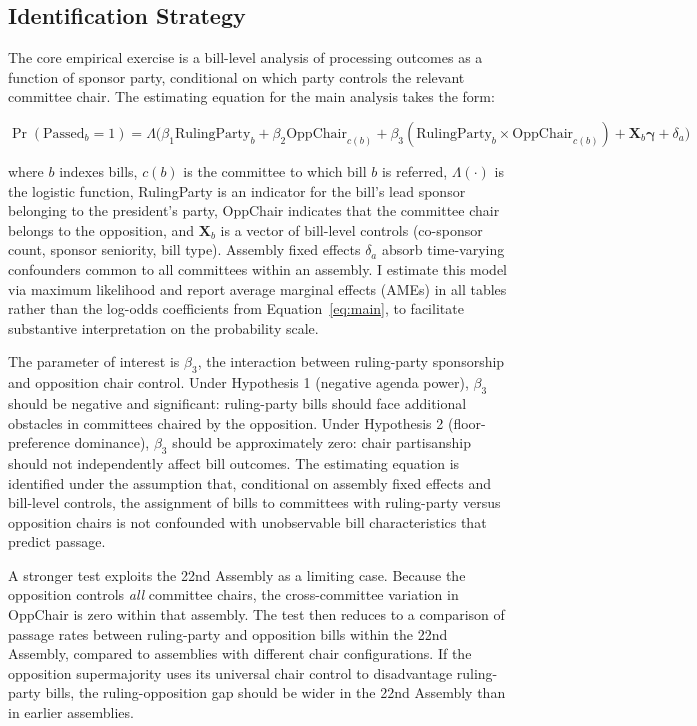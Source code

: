 \documentclass[11pt]{article}
\begin{document}
\subsection{Identification Strategy}
\label{sec:id}

The core empirical exercise is a bill-level analysis of processing outcomes as a function of sponsor party, conditional on which party controls the relevant committee chair. The estimating equation for the main analysis takes the form:

\begin{equation}
\Pr(\text{Passed}_{b} = 1) = \Lambda\bigl(\beta_1 \text{RulingParty}_{b} + \beta_2 \text{OppChair}_{c(b)} + \beta_3 (\text{RulingParty}_{b} \times \text{OppChair}_{c(b)}) + \mathbf{X}_{b}\boldsymbol{\gamma} + \delta_a\bigr)
\label{eq:main}
\end{equation}

\noindent where $b$ indexes bills, $c(b)$ is the committee to which bill $b$ is referred, $\Lambda(\cdot)$ is the logistic function, RulingParty is an indicator for the bill's lead sponsor belonging to the president's party, OppChair indicates that the committee chair belongs to the opposition, and $\mathbf{X}_{b}$ is a vector of bill-level controls (co-sponsor count, sponsor seniority, bill type). Assembly fixed effects $\delta_a$ absorb time-varying confounders common to all committees within an assembly. I estimate this model via maximum likelihood and report average marginal effects (AMEs) in all tables rather than the log-odds coefficients from Equation~\ref{eq:main}, to facilitate substantive interpretation on the probability scale.

The parameter of interest is $\beta_3$, the interaction between ruling-party sponsorship and opposition chair control. Under Hypothesis 1 (negative agenda power), $\beta_3$ should be negative and significant: ruling-party bills should face additional obstacles in committees chaired by the opposition. Under Hypothesis 2 (floor-preference dominance), $\beta_3$ should be approximately zero: chair partisanship should not independently affect bill outcomes. The estimating equation is identified under the assumption that, conditional on assembly fixed effects and bill-level controls, the assignment of bills to committees with ruling-party versus opposition chairs is not confounded with unobservable bill characteristics that predict passage.

A stronger test exploits the 22nd Assembly as a limiting case. Because the opposition controls \textit{all} committee chairs, the cross-committee variation in OppChair is zero within that assembly. The test then reduces to a comparison of passage rates between ruling-party and opposition bills within the 22nd Assembly, compared to assemblies with different chair configurations. If the opposition supermajority uses its universal chair control to disadvantage ruling-party bills, the ruling-opposition gap should be wider in the 22nd Assembly than in earlier assemblies.
\end{document}
